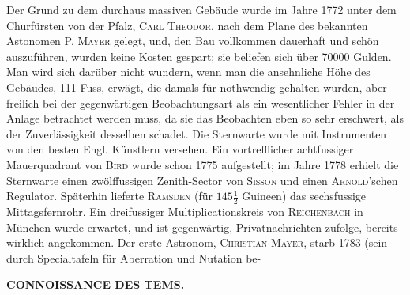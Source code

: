 Der Grund zu dem durchaus massiven Gebäude wurde im Jahre 1772 unter dem Churfürsten von der Pfalz, \textsc{Carl Theodor}, nach dem Plane des bekannten Astonomen P. \textsc{Mayer} gelegt, und, den Bau vollkommen dauerhaft und schön auszuführen, wurden keine Kosten gespart; sie beliefen sich über 70000 Gulden. Man wird sich darüber nicht wundern, wenn man die ansehnliche Höhe des Gebäudes, 111 Fuss, erwägt, die damals für nothwendig gehalten wurden, aber freilich bei der gegenwärtigen Beobachtungsart als ein wesentlicher Fehler in der Anlage betrachtet werden muss, da sie das Beobachten eben so sehr erschwert, als der Zuverlässigkeit desselben schadet. Die Sternwarte wurde mit Instrumenten von den besten Engl. Künstlern versehen. Ein vortrefflicher achtfussiger Mauerquadrant von \textsc{Bird} wurde schon 1775 aufgestellt; im Jahre 1778 erhielt die Sternwarte einen zwölffussigen Zenith-Sector von \textsc{Sisson} und einen \textsc{Arnold}'schen Regulator. Späterhin lieferte \textsc{Ramsden} (für $145\tfrac{1}{2}$ Guineen) das sechsfussige Mittagsfernrohr. Ein dreifussiger Multiplicationskreis von \textsc{Reichenbach} in München wurde erwartet, und ist gegenwärtig, Privatnachrichten zufolge, bereits wirklich angekommen. Der erste Astronom, \textsc{Christian Mayer}, starb 1783 (sein durch Specialtafeln für Aberration und Nutation be-\par
\clearpage
\endgroup
\begingroup
\pagestyle{empty}
\newcommand{\GaussVIGathering}[2]{%
  \fancypagestyle{gaussVIGathering}{%
    \fancyhf{}%
    \renewcommand{\headrulewidth}{0pt}%
    \renewcommand{\footrulewidth}{0pt}%
    \fancyfoot[C]{\makebox[\textwidth][l]{%
      \hspace*{.025\textwidth}{\footnotesize\bfseries #1}\hfill
      {\normalsize\bfseries\textls[90]{#2}}\hspace*{.18\textwidth}}}%
  }%
  \thispagestyle{gaussVIGathering}%
}
\noindent{}%
\makebox[12mm][l]{}%
\parbox[t]{\dimexpr\linewidth-24mm\relax}{\centering\footnotesize\bfseries CONNOISSANCE DES TEMS.\par}%
\par\nobreak\medskip

